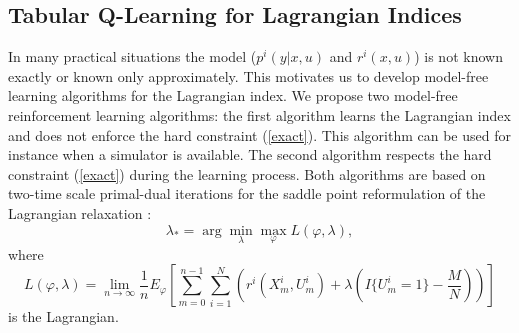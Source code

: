 \documentclass[12pt]{article}
\numberwithin{equation}{section}
\newcommand{\1}{\textbf{1}}
\begin{document}
\subsection{Tabular Q-Learning for Lagrangian Indices}
\label{sec:tabular}

In many practical situations the model ($p^i(y|x,u)$ and $r^i(x,u)$) is not known exactly or known  only approximately.
This motivates us to develop model-free learning algorithms for the Lagrangian index. We propose two  model-free reinforcement
learning algorithms: the first algorithm learns the Lagrangian index and does not enforce the hard constraint (\ref{exact}).
This algorithm can be used for instance when a simulator is available. The second algorithm respects the hard
constraint (\ref{exact}) during the learning process. Both algorithms are based on two-time scale primal-dual iterations for 
the saddle point reformulation of the Lagrangian relaxation \cite{Altman,Bertsekas}:
\begin{equation}
\label{saddle}
\lambda_* = \arg \min_\lambda \max_\varphi L(\varphi,\lambda),
\end{equation}
where 
$$
L(\varphi,\lambda) = 
\lim_{n\to\infty}\frac{1}{n}E_\varphi\left[\sum_{m=0}^{n-1}\sum_{i=1}^N\left(r^i(X^i_m,U^i_m) + \lambda \left(I\{U^i_m=1\}- \frac{M}{N}\right)\right)\right]
$$
is the Lagrangian. 
\end{document}
